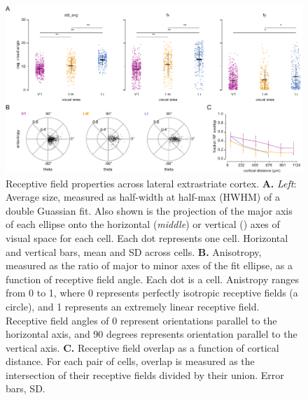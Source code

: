 
\begin{figure}[t!]
    \includegraphics[width=\textwidth]{figures/chapter_3/fig_3-4_rf_aggregate/fig_3-4_rf_aggregate.pdf}
    \vspace{.1in}
    \caption[Receptive field properties]{Receptive field properties across lateral extrastriate cortex. 
    \textbf{A.} \textit{Left}: Average size, measured as half-width at half-max (HWHM) of a double Guassian fit. Also shown is the projection of the major axis of each ellipse onto the horizontal (\textit{middle}) or vertical () axes of visual space for each cell. Each dot represents one cell. Horizontal and vertical bars, mean and SD across cells. 
    \textbf{B.} Anisotropy, measured as the ratio of major to minor axes of the fit ellipse, as a function of receptive field angle. Each dot is a cell. Anistropy ranges from 0 to 1, where 0 represents perfectly isotropic receptive fields (a circle), and 1 represents an extremely linear receptive field. Receptive field angles of 0 represent orientations parallel to the horizontal axis, and 90 degrees represents orientation parallel to the vertical axis.
    \textbf{C.} Receptive field overlap as a function of cortical distance. For each pair of cells, overlap is measured as the intersection of their receptive fields divided by their union. Error bars, SD.  
    \label{fig:rf_aggregate}}
\end{figure}

